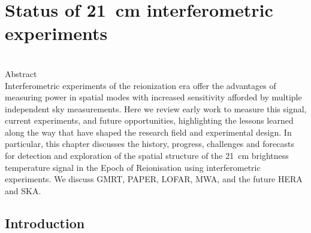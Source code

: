 \chapter{Status of 21~cm interferometric experiments}

\begin{bf}
  \author{Cathryn M. Trott (ICRAR-Curtin), Jonathan Pober (Brown University)}\\

Abstract\\

Interferometric experiments of the reionization era offer the advantages of measuring power in spatial modes with increased sensitivity afforded by multiple independent sky measurements. Here we review early work to measure this signal, current experiments, and future opportunities, highlighting the lessons learned along the way that have shaped the research field and experimental design. In particular, this chapter discusses the history, progress, challenges and forecasts for detection and exploration of the spatial structure of the 21~cm brightness temperature signal in the Epoch of Reionisation using interferometric experiments. We discuss GMRT, PAPER, LOFAR, MWA, and the future HERA and SKA.
\end{bf}

\section{Introduction}

